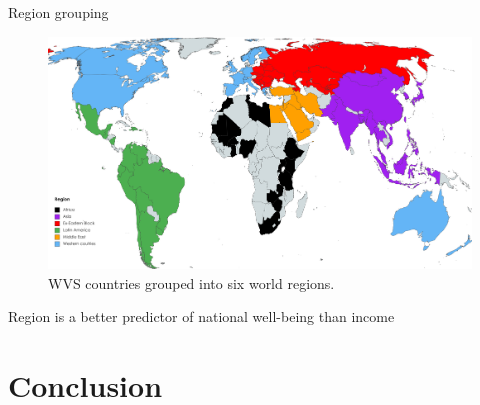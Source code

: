 \documentclass[aspectratio=169,xcolor=dvipsnames, 11pt,mathserif]{beamer}
\begin{document}
\begin{frame}{Region grouping}
    \begin{figure}
        \caption{WVS countries grouped into six world regions.}  
        \centering \includegraphics[height=.8\textheight]{../figures/WVS_countries_regions} %
    \end{figure}
\end{frame}

\begin{frame}{Region is a better predictor of national well-being than income}
    \bbvs
    \ip 
    \ip 
    \ee
\end{frame}

\section{Conclusion}
\end{document}
